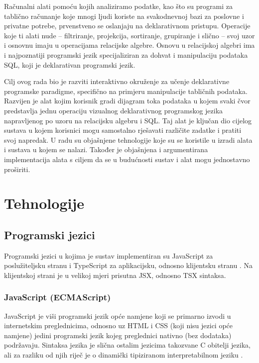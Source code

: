 \documentclass[times, utf8, diplomski, numeric]{fer}
\newcommand{\razmaks}{\vspace{10pt}}
\begin{document}
Računalni alati pomoću kojih analiziramo podatke, kao što su programi za tablično računanje koje mnogi ljudi koriste na svakodnevnoj bazi za poslovne i privatne potrebe, prvenstveno se oslanjaju na deklarativnom pristupu. 
Operacije koje ti alati nude -- filtriranje, projekcija, sortiranje, grupiranje i slično -- svoj uzor i osnovnu imaju u operacijama relacijske algebre.
Osnovu u relacijskoj algebri ima i najpoznatiji programski jezik specijaliziran za dohvat i manipulaciju podataka SQL, koji je deklarativan programski jezik.

\newpage

Cilj ovog rada bio je razviti interaktivno okruženje za učenje deklarativne programske paradigme, specifično na primjeru manipulacije tabličnih podataka.
Razvijen je alat kojim korisnik gradi dijagram toka podataka u kojem svaki čvor predstavlja jednu operaciju vizualnog deklarativnog programskog jezika napravljenog po uzoru na relacijsku algebru i SQL.
Taj alat je ključan dio cijelog sustava u kojem korisnici mogu samostalno rješavati različite zadatke i pratiti svoj napredak.
U radu su objašnjene tehnologije koje su se koristile u izradi alata i sustava u kojem se nalazi.
Također je objašnjena i argumentirana implementacija alata s ciljem da se u budućnosti sustav i alat mogu jednostavno proširiti.



\chapter{Tehnologije}


\section{Programski jezici}

Programski jezici u kojima je sustav implementiran su JavaScript za poslužiteljsku stranu  i TypeScript za aplikacijsku, odnosno klijentsku stranu .
Na klijentskoj strani je u velikoj mjeri prisutna JSX, odnosno TSX sintaksa.


\razmaks
\subsection{JavaScript (ECMAScript)}

JavaScript je viši programski jezik opće namjene koji se primarno izvodi u internetskim preglednicima, odnosno uz HTML i CSS (koji nisu jezici opće namjene) jedini programski jezik kojeg preglednici nativno (bez dodataka) podržavaju.
Sintaksa jezika je slična ostalim jezicima takozvane C obitelji jezika, ali za razliku od njih riječ je o dinamički tipiziranom  interpretabilnom jeziku \citep{mdn_js}.
\end{document}
